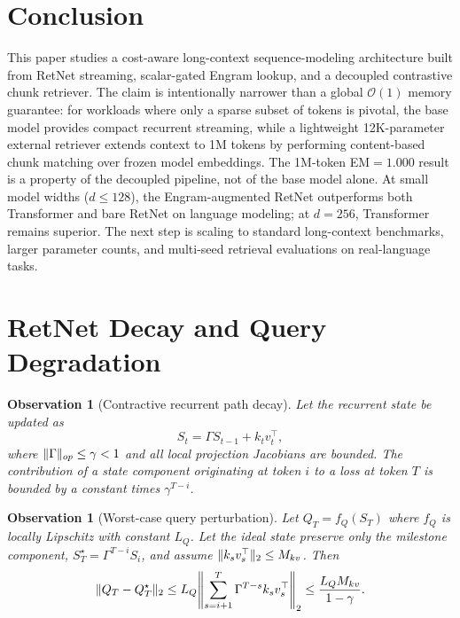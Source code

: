 \documentclass[preprint,12pt]{elsarticle}
\newtheorem{observation}[theorem]{Observation}
\newcommand{\Oh}{\mathcal{O}}
\DeclarePairedDelimiter{\norm}{\lVert}{\rVert}
\begin{document}
\section{Conclusion}

This paper studies a cost-aware long-context sequence-modeling architecture built from RetNet streaming, scalar-gated Engram lookup, and a decoupled contrastive chunk retriever. The claim is intentionally narrower than a global $\Oh(1)$ memory guarantee: for workloads where only a sparse subset of tokens is pivotal, the base model provides compact recurrent streaming, while a lightweight 12K-parameter external retriever extends context to 1M tokens by performing content-based chunk matching over frozen model embeddings. The 1M-token EM$=1.000$ result is a property of the decoupled pipeline, not of the base model alone. At small model widths ($d \leq 128$), the Engram-augmented RetNet outperforms both Transformer and bare RetNet on language modeling; at $d = 256$, Transformer remains superior. The next step is scaling to standard long-context benchmarks, larger parameter counts, and multi-seed retrieval evaluations on real-language tasks.

\newpage
\appendix

\section{RetNet Decay and Query Degradation}
\label{app:retnet}

\begin{observation}[Contractive recurrent path decay]
Let the recurrent state be updated as
\begin{equation}
S_t = \Gamma S_{t-1} + k_t v_t^\top,
\end{equation}
where $\norm{\Gamma}_{op}\leq \gamma<1$ and all local projection Jacobians are bounded. The contribution of a state component originating at token $i$ to a loss at token $T$ is bounded by a constant times $\gamma^{T-i}$.
\end{observation}



\begin{observation}[Worst-case query perturbation]
Let $Q_T=f_Q(S_T)$ where $f_Q$ is locally Lipschitz with constant $L_Q$. Let the ideal state preserve only the milestone component, $S_T^{\star}=\Gamma^{T-i}S_i$, and assume $\norm{k_s v_s^\top}_2\leq M_{kv}$. Then
\begin{equation}
\norm{Q_T-Q_T^{\star}}_2
\leq L_Q\norm*{\sum_{s=i+1}^{T}\Gamma^{T-s}k_s v_s^\top}_2
\leq \frac{L_Q M_{kv}}{1-\gamma}.
\end{equation}
\end{observation}
\end{document}
